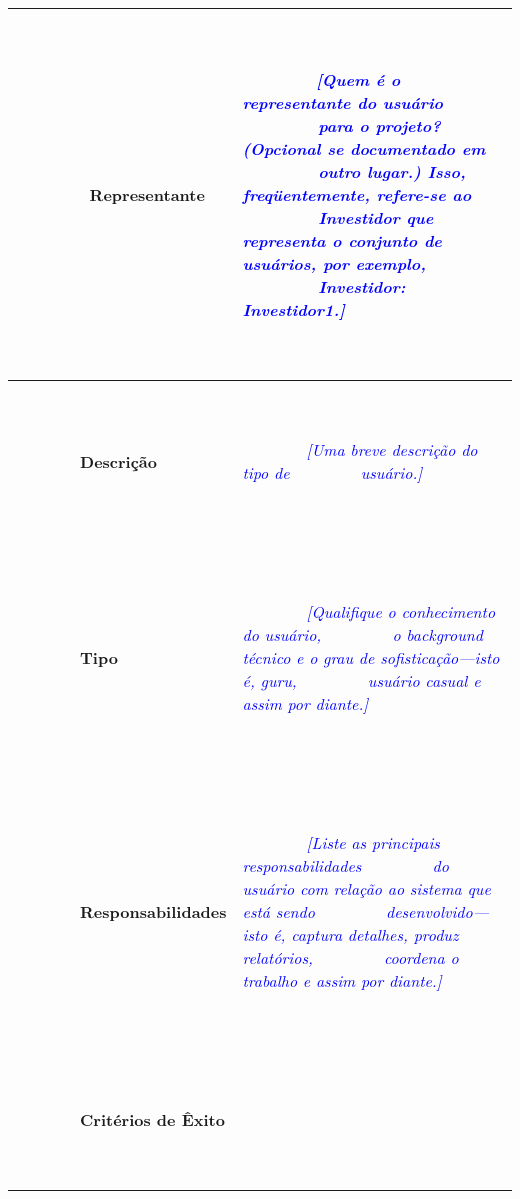 \documentclass[a4paper]{article}
\begin{document}
\bigskip


\bigskip


\bigskip


\bigskip

\begin{flushleft}
\tablefirsthead{}
\tablehead{}
\tabletail{}
\tablelasttail{}
\begin{supertabular}{|m{1.2684599in}|m{4.84416in}|}
\hline
~

\ \ \ \ \ \ \ \ \textbf{Representante}

~
 &
~

\ \ \ \ \ \ \ \ \textit{\textcolor{blue}{[Quem \'e o representante do usu\'ario \ \ \ \ \ \ \ \ para o projeto?
(Opcional se documentado em \ \ \ \ \ \ \ \ outro lugar.) Isso, freq\"uentemente, refere-se ao
\ \ \ \ \ \ \ \ Investidor que representa o conjunto de usu\'arios, por exemplo, \ \ \ \ \ \ \ \ Investidor:
Investidor1.]}}

~
\\\hline
~

\ \ \ \ \ \ \ \ \textbf{Descri\c{c}\~ao}

~
 &
~

\ \ \ \ \ \ \ \ \textit{\textcolor{blue}{[Uma breve descri\c{c}\~ao do tipo de \ \ \ \ \ \ \ \ usu\'ario.]}}

~
\\\hline
~

\ \ \ \ \ \ \ \ \textbf{Tipo}

~
 &
~

\ \ \ \ \ \ \ \ \textit{\textcolor{blue}{[Qualifique o conhecimento do usu\'ario, \ \ \ \ \ \ \ \ o background t\'ecnico
e o grau de sofistica\c{c}\~ao---isto \'e, guru, \ \ \ \ \ \ \ \ usu\'ario casual e assim por diante.]
}}\ \ \ \ \ \ \ \ 

~
\\\hline
~

\ \ \ \ \ \ \ \ \textbf{Responsabilidades}

~
 &
~

\ \ \ \ \ \ \ \ \textit{\textcolor{blue}{[Liste as principais responsabilidades \ \ \ \ \ \ \ \ do usu\'ario com
rela\c{c}\~ao ao sistema que est\'a sendo \ \ \ \ \ \ \ \ desenvolvido--- isto \'e, captura detalhes, produz
relat\'orios, \ \ \ \ \ \ \ \ coordena o trabalho e assim por diante.]}}

~
\\\hline
~

\ \ \ \ \ \ \ \ \textbf{Crit\'erios de \^Exito}

~
 &
~


\end{supertabular}
\end{flushleft}
\end{document}
